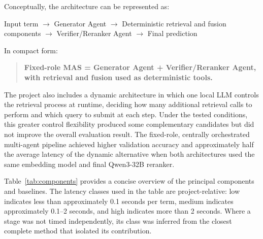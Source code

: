Conceptually, the architecture can be represented as:

\begin{center}
\small
Input term $\rightarrow$ Generator Agent $\rightarrow$ Deterministic retrieval and fusion components $\rightarrow$ Verifier/Reranker Agent $\rightarrow$ Final prediction
\end{center}

In compact form:

\begin{quote}
\textbf{Fixed-role MAS = Generator Agent + Verifier/Reranker Agent, with retrieval and fusion used as deterministic tools.}
\end{quote}

The project also includes a dynamic architecture in which one local LLM controls the retrieval process at runtime, deciding how many additional retrieval calls to perform and which query to submit at each step. Under the tested conditions, this greater control flexibility produced some complementary candidates but did not improve the overall evaluation result. The fixed-role, centrally orchestrated multi-agent pipeline achieved higher validation accuracy and approximately half the average latency of the dynamic alternative when both architectures used the same embedding model and final Qwen3-32B reranker.

Table~\ref{tab:components} provides a concise overview of the principal components and baselines. The latency classes used in the table are project-relative: low indicates less than approximately 0.1 seconds per term, medium indicates approximately 0.1--2 seconds, and high indicates more than 2 seconds. Where a stage was not timed independently, its class was inferred from the closest complete method that isolated its contribution.

